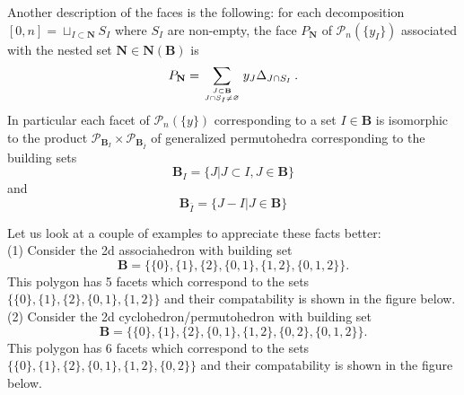\documentclass[hidelinks,12pt]{article}
\newcommand{\bea}[1]{\begin{eqnarray}\label{#1} }
\newcommand{\eea}{\end{eqnarray}}
\def\bea{\begin{eqnarray}}
\def\eea{\end{eqnarray}}
\begin{document}
Another description of the faces is the following: for each decomposition $[0,n]=  \sqcup_{I \subset {\mathbf N} } S_I $ where $S_I$ are non-empty, the face $P_\mathbf{N}$ of ${\mathscr P_n(\{y_I\})}$ associated with the nested set ${\mathbf N} \in {\mathbf N}({\mathbf B})$ is
\bea
P_\mathbf{N} = \sum_{{J \subset {\mathbf B}}\atop{J \cap S_I \neq \varnothing}} y_{J} \Delta_{J \cap S_I} \:.
\eea
In particular each facet of $\mathscr{P}_{n}(\{y\})$ corresponding to a set $I \in \mathbf{B}$ is isomorphic to the product $\mathscr{P}_{ \mathbf{B}_{I}} \times \mathscr{P}_{\mathbf{B}_{\bar{I}}}$ of generalized permutohedra corresponding to the building sets 
\begin{equation}\label{BI}
    \mathbf{B}_{I} = \{J \vert J\subset I, J\in \mathbf{B}\}
\end{equation}
and
\begin{equation} \label{BIbar}
    \mathbf{B}_{\bar{I}}=\{J-I \vert J\in \mathbf{B}\}
\end{equation}





Let us look at a couple of examples to appreciate these facts better: \\
(1) Consider the 2d associahedron with building set 
\[{\mathbf B}= \{ \{0\},\{1\},\{2\},\{0,1\},\{1,2\},\{0,1,2\} \}.\]
This polygon has 5 facets which correspond to the sets $\{ \{0\},\{1\},\{2\},\{0,1\},\{1,2\}\}$ and their compatability is shown in the figure below. \\
(2) Consider the 2d cyclohedron/permutohedron with building set 
\[{\mathbf B}= \{ \{0\},\{1\},\{2\},\{0,1\},\{1,2\},\{0,2\},\{0,1,2\} \}.\]
This polygon has 6 facets which correspond to the sets $\{ \{0\},\{1\},\{2\},\{0,1\},\{1,2\},\{0,2\}\}$ and their compatability is shown in the figure below.
\end{document}
